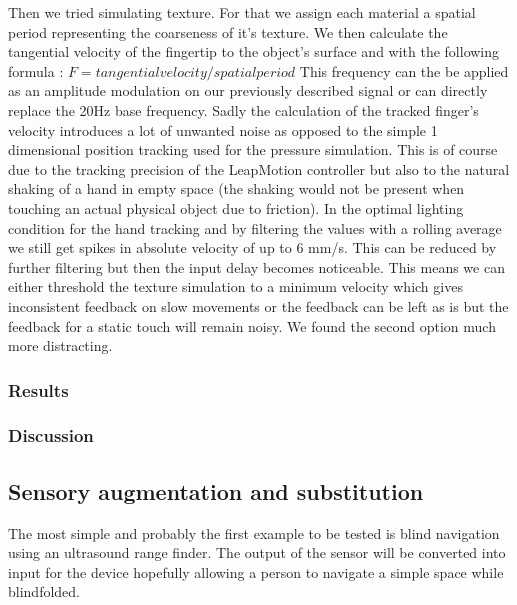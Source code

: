 \documentclass[10pt,journal,compsoc]{IEEEtran}
\begin{document}
	Then we tried simulating texture. For that we assign each material a spatial period representing the coarseness of it's texture. We then calculate the tangential velocity of the fingertip to the object's surface and with the following formula \cite{bensmaia2003smr} :
	$F = tangential velocity / spatial period$
	This frequency can the be applied as an amplitude modulation on our previously described signal or can directly replace the 20Hz base frequency.
	Sadly the calculation of the tracked finger's velocity introduces a lot of unwanted noise as opposed to the simple 1 dimensional position tracking used for the pressure simulation. This is of course due to the tracking precision of the LeapMotion controller but also to the natural shaking of a hand in empty space (the shaking would not be present when touching an actual physical object due to friction). In the optimal lighting condition for the hand tracking and by filtering the values with a rolling average we still get spikes in absolute velocity of up to 6 mm/s. This can be reduced by further filtering but then the input delay becomes noticeable.
	This means we can either threshold the texture simulation to a minimum velocity which gives inconsistent feedback on slow movements or the feedback can be left as is but the feedback for a static touch will remain noisy. We found the second option much more distracting. 
	
	
	
	
	
	
		\subsubsection{Results}
		
		\subsubsection{Discussion}
	
	
	\subsection{Sensory augmentation and substitution}
		The most simple and probably the first example to be tested is blind navigation using an ultrasound range finder.
		The output of the sensor will be converted into input for the device hopefully allowing a person to navigate a simple space while blindfolded.
\end{document}
